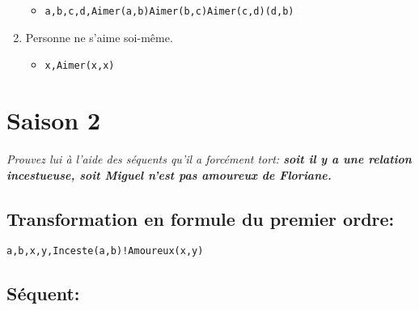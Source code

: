 \documentclass[Arial, 11pt]{article}
\begin{document}
\begin{enumerate}
    \begin{itemize}
        \item \begin{alltt}\exists a,b,c,d, Aimer(a,b) \bigwedge Aimer(b,c) \bigwedge Aimer(c,d) \bigwedge (d,b)\end{alltt}
    \end{itemize}
    \item Personne ne s'aime soi-même.
    \begin{itemize}
        \item \begin{alltt}\forall x, \neg Aimer(x,x)\end{alltt}
    \end{itemize}
\end{enumerate}
\section{Saison 2}
\emph{
Prouvez lui à l’aide des séquents qu’il a forcément tort:
\textbf{soit il y a une relation incestueuse, soit Miguel n’est pas amoureux de Floriane.}}

\subsection*{Transformation en formule du premier ordre:}
\begin{alltt}\exists a,b,x,y, Inceste(a,b) \bigvee !Amoureux(x,y)\end{alltt}

\subsection*{Séquent:}
\begin{alltt}\end{alltt}
\end{document}
